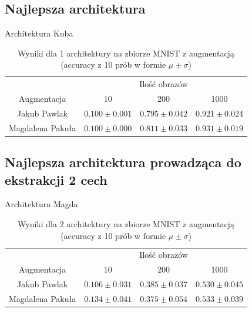 \documentclass[10pt]{article}
\begin{document}
\subsection*{Najlepsza architektura}

Architektura Kuba

\begin{table}[H]\centering
    \begin{tabular}{cccc}
        \toprule
                     & \multicolumn{3}{c}{Ilość obrazów}                                            \\ \cmidrule{2-4}
        Augmentacja  & 10                                & 200                 & 1000               \\ \midrule
        Jakub Pawlak & $0.100 \pm 0.001 $               & $0.795 \pm 0.042 $ & $0.921 \pm 0.024$ \\
        Magdalena Pakuła & $0.100 \pm 0.000 $                & $0.811 \pm 0.033 $ & $0.931 \pm 0.019$ \\
        \bottomrule
    \end{tabular}
    \caption{Wyniki dla 1 architektury na zbiorze MNIST z augmentacją (accuracy z 10 prób w formie $\mu \pm \sigma$)}
\end{table}

\subsection*{Najlepsza architektura prowadząca do ekstrakcji 2 cech}

Architektura Magda

\begin{table}[H]\centering
    \begin{tabular}{cccc}
        \toprule
                         & \multicolumn{3}{c}{Ilość obrazów}                                          \\ \cmidrule{2-4}
        Augmentacja      & 10                                & 200                & 1000              \\ \midrule
        Jakub Pawlak     & $0.106 \pm 0.031 $                & $0.385 \pm 0.037 $ & $0.530 \pm 0.045$ \\
        Magdalena Pakuła & $0.134 \pm 0.041 $                & $0.375 \pm 0.054 $ & $0.533 \pm 0.039$ \\
        \bottomrule
    \end{tabular}
    \caption{Wyniki dla 2 architektury na zbiorze MNIST z augmentacją (accuracy z 10 prób w formie $\mu \pm \sigma$)}
\end{table}
\end{document}
